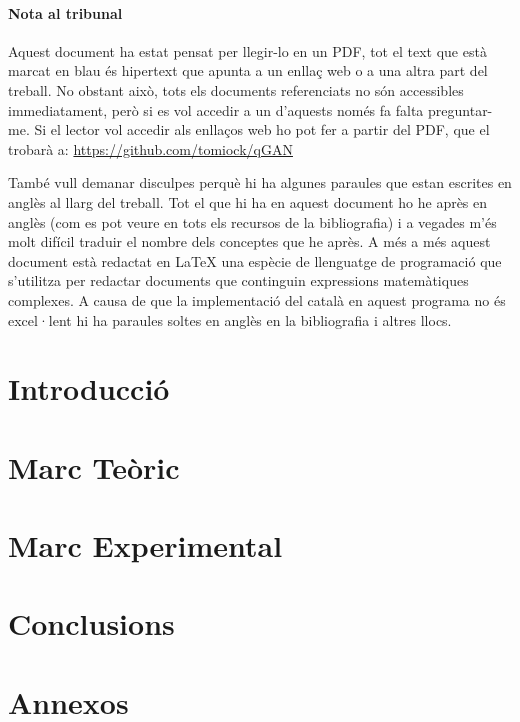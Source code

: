 \documentclass[a4paper,12pt,arial,numbered,print,oneside]{book}
\newcommand\blankpage{%
	\null
	\thispagestyle{empty}%
	\addtocounter{page}{-1}%
	\newpage}
\begin{document}
	\clearpage
	\thispagestyle{plain}
	
	\subsection*{Nota al tribunal}
	Aquest document ha estat pensat per llegir-lo en un PDF, tot el text que està marcat en blau és hipertext que apunta a un enllaç web o a una altra part del treball. No obstant això, tots els documents referenciats no són accessibles immediatament, però si es vol accedir a un d'aquests només fa falta preguntar-me. Si el lector vol accedir als enllaços web ho pot fer a partir del PDF, que el trobarà a: \href{https://github.com/tomiock/qGAN}{https://github.com/tomiock/qGAN}	
	
	També vull demanar disculpes perquè hi ha algunes paraules que estan escrites en anglès al llarg del treball. Tot el que hi ha en aquest document ho he après en anglès (com es pot veure en tots els recursos de la bibliografia) i a vegades m'és molt difícil traduir el nombre dels conceptes que he après. A més a més aquest document està redactat en \LaTeX{} una espècie de llenguatge de programació que s'utilitza per redactar documents que continguin expressions matemàtiques complexes. A causa de\texttt{} que la implementació del català en aquest programa no és excel·lent hi ha paraules soltes en anglès en la bibliografia i altres llocs.
	
	\afterpage{\blankpage}
	
	\part{Introducció}
	\label{part:intro}
	
	
	\part{Marc Teòric}
	\label{part:theoretical_framework}
	
	
	\part{Marc Experimental}
	\label{part:experimental_work}
	
	
	\part{Conclusions}
	\label{part:conclusions}
	

	\setcounter{chapter}{0}
	\renewcommand{\thechapter}{\Alph{chapter}}
	\part{Annexos}
	\label{part:appendices}
	

	\typeout{}
	
	
	
\end{document}
